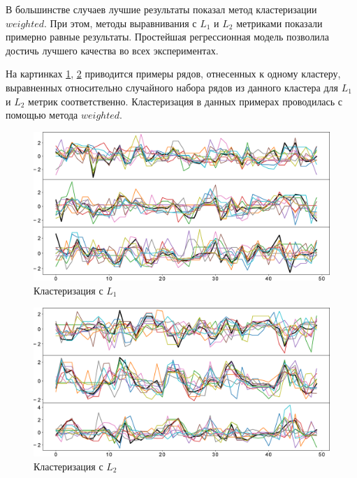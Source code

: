 \documentclass[12pt,twoside]{article}
\begin{document}
    В большинстве случаев лучшие результаты показал метод кластеризации $weighted$.
    При этом, методы выравнивания с $L_1$ и $L_2$ метриками показали примерно равные результаты. Простейшая регрессионная модель позволила достичь лучшего качества во всех экспериментах.
						
    На картинках \ref{img1}, \ref{img2} приводится примеры рядов, отнесенных к одному кластеру,
        выравненных относительно случайного набора рядов из данного кластера для $L_1$ и $L_2$ метрик соответственно.
    Кластеризация в данных примерах проводилась с помощью метода $weighted$.

    \begin{figure}[h!]
        \includegraphics[width=\textwidth]{images/img2.eps}
        \caption{Кластеризация с $L_1$} \label{img1}
    \end{figure}
    \begin{figure}[h!]
        \includegraphics[width=\textwidth]{images/img3.eps}
        \caption{Кластеризация с $L_2$} \label{img2}
    \end{figure}                
    
    

     
    
    
\end{document}
